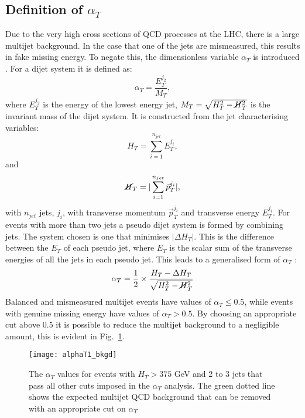 \subsection{Definition of \boldmath $\alpha_T$}

Due to the very high cross sections of QCD processes at the LHC, there is a large multijet background. In the case that one of the jets are mismeasured, this results in fake missing energy. To negate this, the dimensionless variable $\alpha_T$ is introduced \cite{AlphaTproposalCMS:2008vya} \cite{AlphaTproposalPhysRevLett.101.221803}. For a dijet system it is defined as:
\begin{equation}
\alpha_T=\frac{E_T^{j_2}}{M_T},
\end{equation}
where $E_T^{j_2}$ is the energy of the lowest energy jet, $M_T=\sqrt{H_T^2-\cancel{H}_T^2}$ is the invariant mass of the dijet system. It is constructed from the jet characterising variables:
\begin{equation}
H_T=\sum_{i=1}^{n_{jet}}E_T^{j_i}, 
\end{equation}
and
\begin{equation}
\cancel{H}_T=|\sum_{i=1}^{n_{jet}}\vec{p}_T^{j_i}|,
\end{equation}
with $n_{jet}$ jets, $j_i$, with transverse momentum $\vec{p}_T^{j_i}$ and transverse energy $E_T^{j_i}$. For events with more than two jets a pseudo dijet system is formed by combining jets. The system chosen is one that minimises $|\Delta H_T|$. This is the difference between the $E_T$ of each pseudo jet, where $E_T$ is the scalar sum of the transverse energies of all the jets in each pseudo jet. This leads to a generalised form of $\alpha_T$ \cite{AlphaT8TeVChatrchyan:2013lya}:
\begin{equation}
\alpha_T=\frac{1}{2}\times\frac{H_T-\Delta H_T}{\sqrt{H_T^2-\cancel{H}_T^2}}
\end{equation}
Balanced and mismeasured multijet events have values of $\alpha_T\leq0.5$, while events with genuine missing energy have values of $\alpha_T>0.5$. By choosing an appropriate cut above $0.5$ it is possible to reduce the multijet background to a negligible amount, this is evident in Fig.~\ref{fig:alphaT}. 

\begin{figure}
	\begin{center}
		\texttt{[image: alphaT1\_bkgd]}
	\end{center}
	\caption{The $\alpha_T$ values for events with $H_T>375$ GeV and 2 to 3 jets that pass all other cuts imposed in the $\alpha_T$ analysis. The green dotted line shows the expected multijet QCD background that can be removed with an appropriate cut on $\alpha_T$ \cite{AlphaT8TeVChatrchyan:2013lya}}
	\label{fig:alphaT}
\end{figure}

